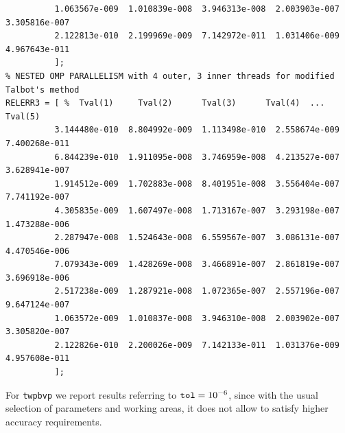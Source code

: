 \documentclass[a4paper,10pt]{report}%
\begin{document}
\begin{lstlisting}
          1.063567e-009  1.010839e-008  3.946313e-008  2.003903e-007  3.305816e-007
          2.122813e-010  2.199969e-009  7.142972e-011  1.031406e-009  4.967643e-011
          ];
% NESTED OMP PARALLELISM with 4 outer, 3 inner threads for modified Talbot's method
RELERR3 = [ %  Tval(1)     Tval(2)      Tval(3)      Tval(4)  ... Tval(5)
          3.144480e-010  8.804992e-009  1.113498e-010  2.558674e-009  7.400268e-011
          6.844239e-010  1.911095e-008  3.746959e-008  4.213527e-007  3.628941e-007
          1.914512e-009  1.702883e-008  8.401951e-008  3.556404e-007  7.741192e-007
          4.305835e-009  1.607497e-008  1.713167e-007  3.293198e-007  1.473288e-006
          2.287947e-008  1.524643e-008  6.559567e-007  3.086131e-007  4.470546e-006
          7.079343e-009  1.428269e-008  3.466891e-007  2.861819e-007  3.696918e-006
          2.517238e-009  1.287921e-008  1.072365e-007  2.557196e-007  9.647124e-007
          1.063572e-009  1.010837e-008  3.946310e-008  2.003902e-007  3.305820e-007
          2.122826e-010  2.200026e-009  7.142133e-011  1.031376e-009  4.957608e-011
          ];
\end{lstlisting}
For {\tt twpbvp} we report results referring to ${\tt tol}=10^{-6}$, since with the usual selection of
parameters and working areas, it does not allow to satisfy higher accuracy requirements.
\end{document}
